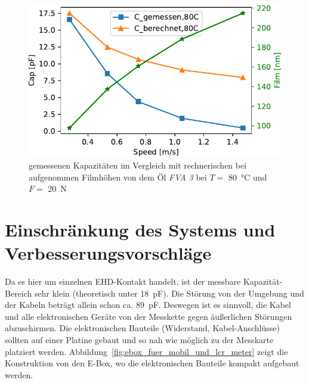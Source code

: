 \begin{figure}[htb]
    \centering
    \includegraphics[]{./images/cap_theo_meas_vs_speed_80C.pdf}
    \caption{gemessenen Kapazitäten im Vergleich mit rechnerischen bei aufgenommen Filmhöhen von dem Öl \textit{FVA 3} bei $T =$ \SI{80}{\degreeCelsius} und $F =$ \SI{20}{\N}}
    \label{fig:cap_meas_cap_theo_80C}
\end{figure}

\section{Einschränkung des Systems und Verbesserungsvorschläge}
\label{sec:einschraenkung_des_systems_und_verbesserungsvorschlaege}

Da es hier um einzelnen EHD-Kontakt handelt, ist der messbare Kapazität-Bereich sehr klein (theoretisch unter \SI{18}{\pico\farad}).
Die Störung von der Umgebung und der Kabeln beträgt allein schon ca. \SI{89}{\pico\farad}.
Deswegen ist es sinnvoll, die Kabel und alle elektronischen Geräte von der Messkette gegen äußerlichen Störungen abzuschirmen.
Die elektronischen Bauteile (Widerstand, Kabel-Anschlüsse) sollten auf einer Platine gebaut und so nah wie möglich zu der Messkarte platziert werden.
Abbildung~\ref{fig:ebox_fuer_mobil_und_lcr_meter} zeigt die Konstruktion von den E-Box, wo die elektronischen Bauteile kompakt aufgebaut werden.

